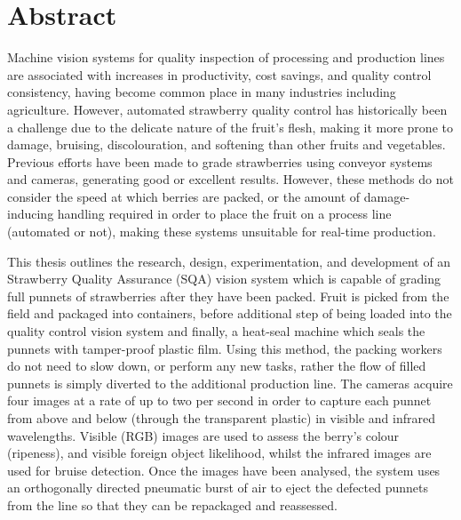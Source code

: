 \documentclass[fleqn,twoside,12pt]{report}
\begin{document}
\restoregeometry









\chapter*{Abstract}



Machine vision systems for quality inspection of processing and production lines are associated with increases in productivity, cost savings, and quality control consistency, having become common place in many industries including agriculture. However, automated strawberry quality control has historically been a challenge due to the delicate nature of the fruit's flesh, making it more prone to damage, bruising, discolouration, and softening than other fruits and vegetables. Previous efforts have been made to grade strawberries using conveyor systems and cameras, generating good or excellent results. However, these methods do not consider the speed at which berries are packed, or the amount of damage-inducing handling required in order to place the fruit on a process line (automated or not), making these systems unsuitable for real-time production. 

This thesis outlines the research, design, experimentation, and development of an Strawberry Quality Assurance (SQA) vision system which is capable of grading full punnets of strawberries after they have been packed. Fruit is picked from the field and packaged into containers, before additional step of being loaded into the quality control vision system and finally, a heat-seal machine which seals the punnets with tamper-proof plastic film. Using this method, the packing workers do not need to slow down, or perform any new tasks, rather the flow of filled punnets is simply diverted to the additional production line. The cameras acquire four images at a rate of up to two per second in order to capture each punnet from above and below (through the transparent plastic) in visible and infrared wavelengths. Visible (RGB) images are used to assess the berry's colour (ripeness), and visible foreign object likelihood, whilst the infrared images are used for bruise detection. Once the images have been analysed, the system uses an orthogonally directed pneumatic burst of air to eject the defected punnets from the line so that they can be repackaged and reassessed. 
\end{document}
